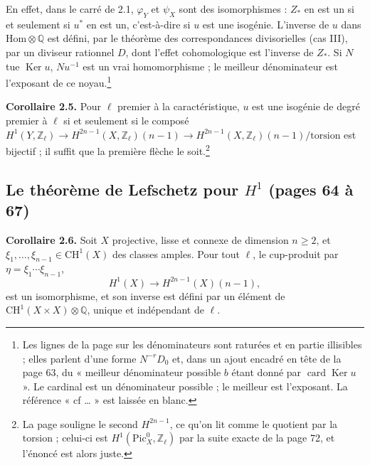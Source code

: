 \documentclass[11pt,a4paper]{article}
\begin{document}
En effet, dans le carré de 2.1, $\varphi_{Y}$ et $\psi_{X}$ sont des
isomorphismes : $Z_{*}$ en est un si et seulement si $u^{*}$ en est un,
c'est-à-dire si $u$ est une isogénie. L'inverse de $u$ dans
$\mathrm{Hom}\otimes\mathbb{Q}$ est défini, par le théorème des correspondances
divisorielles (cas III), par un diviseur rationnel $D$, dont l'effet
cohomologique est l'inverse de $Z_{*}$. Si $N$ tue $\operatorname{Ker} u$, $N
u^{-1}$ est un vrai homomorphisme ; le meilleur dénominateur est l'exposant de
ce noyau.\footnote{Les lignes de la page sur les dénominateurs sont raturées et
en partie illisibles ; elles parlent d'une forme $N^{-r}D_{0}$ et, dans un ajout
encadré en tête de la page 63, du « meilleur dénominateur possible $b$ étant
donné par $\operatorname{card}\operatorname{Ker} u$ ». Le cardinal est un
dénominateur possible ; le meilleur est l'exposant. La référence « cf … »
est laissée en blanc.}

\textbf{Corollaire 2.5.} Pour $\ell$ premier à la caractéristique, $u$ est une
isogénie de degré premier à $\ell$ si et seulement si le composé
$H^{1}(Y, \mathbb{Z}_{\ell}) \to H^{2n-1}(X, \mathbb{Z}_{\ell})(n-1) \to
H^{2n-1}(X, \mathbb{Z}_{\ell})(n-1)/\mathrm{torsion}$ est bijectif ; il suffit
que la première flèche le soit.\footnote{La page souligne le second $H^{2n-1}$,
ce qu'on lit comme le quotient par la torsion ; celui-ci est $H^{1}(
\mathrm{Pic}^{0}_{X}, \mathbb{Z}_{\ell})$ par la suite exacte de la page 72, et
l'énoncé est alors juste.}

\subsection*{Le théorème de Lefschetz pour $H^{1}$ (pages 64 à 67)}

\textbf{Corollaire 2.6.} Soit $X$ projective, lisse et connexe de dimension $n
\geqslant 2$, et $\xi_{1}, \ldots, \xi_{n-1} \in \mathrm{CH}^{1}(X)$ des classes
amples. Pour tout $\ell$, le cup-produit par $\eta = \xi_{1}\cdots\xi_{n-1}$,
\[
H^{1}(X) \longrightarrow H^{2n-1}(X)(n-1) ,
\]
est un isomorphisme, et son inverse est défini par un élément de
$\mathrm{CH}^{1}(X \times X) \otimes \mathbb{Q}$, unique et indépendant de
$\ell$.
\end{document}
